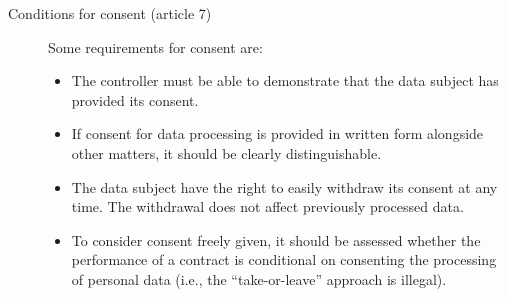\begin{description}
    \item[Conditions for consent (article 7)] 
        Some requirements for consent are:
        \begin{itemize}
            \item The controller must be able to demonstrate that the data subject has provided its consent.
            \item If consent for data processing is provided in written form alongside other matters, it should be clearly distinguishable.
            \item The data subject have the right to easily withdraw its consent at any time. The withdrawal does not affect previously processed data.
            \item To consider consent freely given, it should be assessed whether the performance of a contract is conditional on consenting the processing of personal data (i.e., the ``take-or-leave'' approach is illegal).
        \end{itemize}
\end{description}
